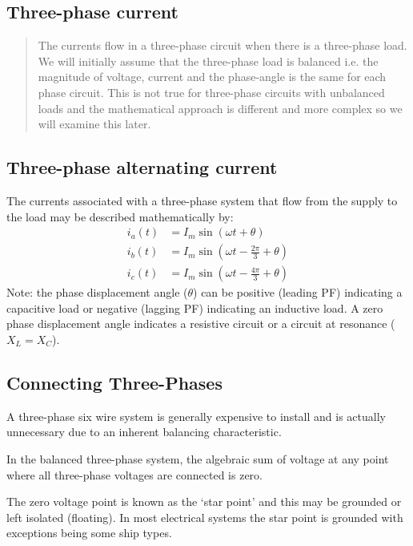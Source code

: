 \documentclass[class=report, crop=false, 12pt,a4paper]{standalone}
\begin{document}
\subsection{Three-phase current}
\begin{quote}
	The currents flow in a three-phase circuit when there is a three-phase load. We will initially assume that the three-phase load is balanced i.e. the magnitude of voltage, current and the phase-angle is the same for each phase circuit. This is not true for three-phase circuits with unbalanced loads and the mathematical approach is different and more complex so we will examine this later.
\end{quote}
\subsection{Three-phase alternating current}
The currents associated with a three-phase system that flow from the supply to the load may be described mathematically by:
\begin{align}
	i_a \left(t\right) &= I_m \sin \left( \omega t + \theta \right)\\
	i_b \left(t\right) &= I_m \sin \left( \omega t - \frac{2\pi}{3} +\theta\right)\\
	i_c \left(t\right) &= I_m \sin \left( \omega t - \frac{4\pi}{3} +\theta\right)
\end{align}
Note: the phase displacement angle ($\theta$) can be positive (leading PF) indicating a capacitive load or negative (lagging PF) indicating an inductive load. A zero phase displacement angle indicates a resistive circuit or a circuit at resonance ($X_L = X_C$).
\subsection{Connecting Three-Phases}
A three-phase six wire system is generally expensive to install and is actually unnecessary due to an inherent balancing characteristic.

In the balanced three-phase system, the algebraic sum of voltage at any point where all three-phase voltages are connected is zero.

The zero voltage point is known as the `star point' and this may be grounded or left isolated (floating). In most electrical systems the star point is grounded with exceptions being some ship types.
\end{document}
